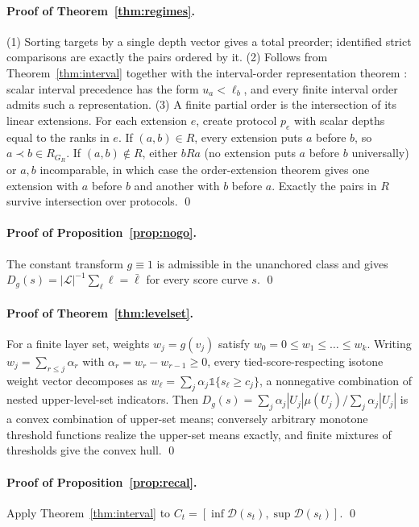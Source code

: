 \documentclass[11pt]{article}
\begin{document}
\paragraph{Proof of Theorem~\ref{thm:regimes}.} (1) Sorting targets by a single depth vector gives a total preorder; identified strict comparisons are exactly the pairs ordered by it. (2) Follows from Theorem~\ref{thm:interval} together with the interval-order representation theorem \citep{fishburn1985interval}: scalar interval precedence has the form $u_a<\ell_b$, and every finite interval order admits such a representation. (3) A finite partial order is the intersection of its linear extensions. For each extension $e$, create protocol $p_e$ with scalar depths equal to the ranks in $e$. If $(a,b)\in R$, every extension puts $a$ before $b$, so $a\prec b\in R_{G_R}$. If $(a,b)\notin R$, either $bRa$ (no extension puts $a$ before $b$ universally) or $a,b$ incomparable, in which case the order-extension theorem \citep{szpilrajn1930extension,dushnikmiller1941partial} gives one extension with $a$ before $b$ and another with $b$ before $a$. Exactly the pairs in $R$ survive intersection over protocols. \qed

\paragraph{Proof of Proposition~\ref{prop:nogo}.} The constant transform $g\equiv 1$ is admissible in the unanchored class and gives $D_g(s)=|\mathcal{L}|^{-1}\sum_\ell \ell=\bar\ell$ for every score curve $s$. \qed

\paragraph{Proof of Theorem~\ref{thm:levelset}.} For a finite layer set, weights $w_j=g(v_j)$ satisfy $w_0=0\le w_1\le\dots\le w_k$. Writing $w_j=\sum_{r\le j}\alpha_r$ with $\alpha_r=w_r-w_{r-1}\ge 0$, every tied-score-respecting isotone weight vector decomposes as $w_\ell=\sum_j \alpha_j \mathbb{1}\{s_\ell\ge c_j\}$, a nonnegative combination of nested upper-level-set indicators. Then $D_g(s)=\sum_j \alpha_j|U_j|\mu(U_j)/\sum_j\alpha_j|U_j|$ is a convex combination of upper-set means; conversely arbitrary monotone threshold functions realize the upper-set means exactly, and finite mixtures of thresholds give the convex hull. \qed

\paragraph{Proof of Proposition~\ref{prop:recal}.} Apply Theorem~\ref{thm:interval} to $C_t=[\inf\mathcal{D}(s_t),\sup\mathcal{D}(s_t)]$. \qed
\end{document}
